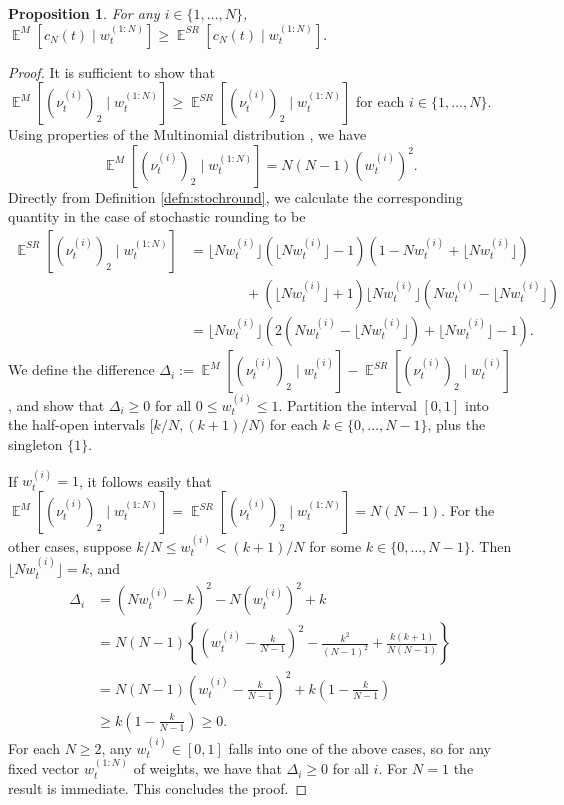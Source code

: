 \documentclass{article} %
\newtheorem{proposition}{Proposition}
\theoremstyle{definition}
\DeclareMathOperator{\E}{\mathbb{E}}
\newcommand{\flnw}{\lfloor N w_t^{(i)} \rfloor}
\newcommand{\1}[1]{\mathbbm{1}_{\{#1\}}}
\begin{document}
\begin{proposition}
For any $i \in \{1, \dots, N\}$,
$
\E^{M}[ c_N(t) \mid w_t^{(1:N)} ] \geq \E^{SR}[ c_N(t) \mid w_t^{(1:N)} ].
$
\end{proposition}
\begin{proof}
It is sufficient to show that $\E^{M}[ (\nu_t^{(i)})_2 \mid w_t^{(1:N)} ] \geq \E^{SR}[ (\nu_t^{(i)})_2 \mid w_t^{(1:N)} ]$ for each $i \in \{1, \dots, N\}$. 
Using properties of the Multinomial distribution \cite{mosimann1962}, we have
\begin{equation*}
\E^{M}[ (\nu_t^{(i)})_2 \mid w_t^{(1:N)} ]  = N(N-1) (w_t^{(i)})^2 .
\end{equation*}
Directly from Definition \ref{defn:stochround}, we calculate the corresponding quantity in the case of stochastic rounding to be
\begin{align*}
\E^{SR}[ (\nu_t^{(i)})_2 \mid w_t^{(1:N)} ] 
&= \flnw (\flnw -1) (1 - Nw_t^{(i)} + \flnw) \\
&\qquad\qquad + (\flnw +1) \flnw (Nw_t^{(i)} - \flnw) \\
&= \flnw \left( 2(Nw_t^{(i)} - \flnw) + \flnw -1 \right) .
\end{align*}
We define the difference $\Delta_i := \E^{M}[ (\nu_t^{(i)})_2 \mid w_t^{(i)} ] - \E^{SR}[ (\nu_t^{(i)})_2 \mid w_t^{(i)} ] $,
and show that $\Delta_i \geq 0$ for all $0 \leq w_t^{(i)} \leq 1$. Partition the interval $[0,1]$ into the half-open intervals $[k/N, (k+1)/N)$ for each $k\in \{0, \dots, N-1\}$, plus the singleton $\{1\}$.

If $w_t^{(i)}=1$, it follows easily that $\E^{M}[ (\nu_t^{(i)})_2 \mid w_t^{(1:N)} ] = \E^{SR}[ (\nu_t^{(i)})_2 \mid w_t^{(1:N)} ] = N(N-1) $. 
For the other cases, suppose $k/N \leq w_t^{(i)} < (k+1)/N $ for some $k \in \{0, \dots, N-1\}$. Then $\flnw = k$, and
\begin{align*}
\Delta_i &= (Nw_t^{(i)} - k)^2 - N (w_t^{(i)})^2 + k\\
&= N(N-1) \left\{ \left( w_t^{(i)} -\frac{k}{N-1} \right)^2 - \frac{k^2}{(N-1)^2} + \frac{k(k+1)}{N(N-1)} \right\}\\
&= N(N-1) \left( w_t^{(i)} -\frac{k}{N-1} \right)^2 + k\left(1-\frac{k}{N-1}\right) \\
&\geq k\left(1-\frac{k}{N-1}\right)
\geq 0 .
\end{align*}
For each $N\geq 2$, any $w_t^{(i)} \in [0,1]$ falls into one of the above cases, so for any fixed vector $w_t^{(1:N)}$ of weights, we have that $\Delta_i \geq 0$ for all $i$. For $N=1$ the result is immediate. This concludes the proof.
\end{proof}
\end{document}
